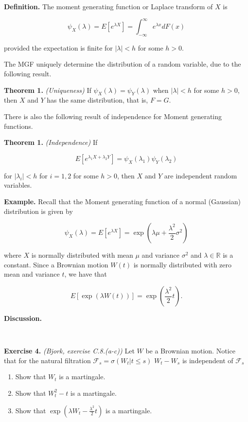 \documentclass[
]{article}
\providecommand{\tightlist}{%
  \setlength{\itemsep}{0pt}\setlength{\parskip}{0pt}}
\begin{document}
\textbf{Definition.} The moment generating function or Laplace transform
of \(X\) is

\[\psi_X(\lambda)=E\left[e^{\lambda X}\right]=\int_{-\infty}^\infty e^{\lambda x}dF(x)\]

provided the expectation is finite for \(\vert\lambda\vert<h\) for some
\(h>0\).

The MGF uniquely determine the distribution of a random variable, due to
the following result.

\textbf{Theorem 1.} \emph{(Uniqueness)} If
\(\psi_X(\lambda)=\psi_Y(\lambda)\) when \(\vert\lambda\vert<h\) for
some \(h>0\), then \(X\) and \(Y\) has the same distribution, that is,
\(F=G\).

There is also the following result of independence for Moment generating
functions.

\textbf{Theorem 1.} \emph{(Independence)} If

\[E\left[e^{\lambda_1X+\lambda_2Y}\right]=\psi_X(\lambda_1)\psi_Y(\lambda_2)\]

for \(\vert\lambda_i\vert<h\) for \(i=1,2\) for some \(h>0\), then \(X\)
and \(Y\) are independent random variables.

\textbf{Example.} Recall that the Moment generating function of a normal
(Gaussian) distribution is given by

\[\psi_X(\lambda)=E\left[e^{\lambda X}\right]=\exp\left(\lambda \mu + \frac{\lambda^2}{2}\sigma^2\right)\]

where \(X\) is normally distributed with mean \(\mu\) and variance
\(\sigma^2\) and \(\lambda\in\mathbb{R}\) is a constant. Since a
Brownian motion \(W(t)\) is normally distributed with zero mean and
variance \(t\), we have that

\[E[\exp(\lambda W(t))]=\exp\left(\frac{\lambda^2}{2}t\right).\]

\textbf{Discussion.}

~

\textbf{Exercise 4.} \emph{(Bjork, exercise C.8.(a-c))} Let \(W\) be a
Brownian motion. Notice that for the natural filtration
\(\mathcal{F}_s=\sigma(W_t\vert t\le s)\) \(W_t-W_s\) is independent of
\(\mathcal{F}_s\)

\begin{enumerate}
\def\labelenumi{\alph{enumi}.}
\tightlist
\item
  Show that \(W_t\) is a martingale.
\item
  Show that \(W^2_t-t\) is a martingale.
\item
  Show that \(\exp(\lambda W_t-\frac{\lambda^2}{2}t)\) is a martingale.
\end{enumerate}
\end{document}

